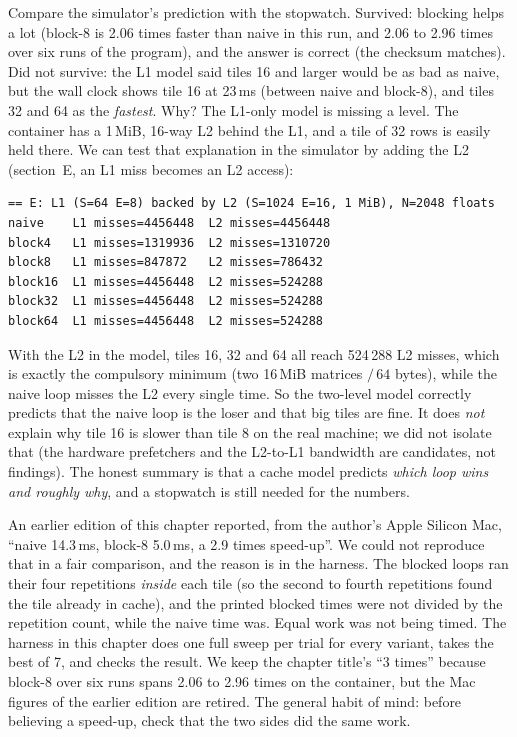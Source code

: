 \begin{example}
Compare the simulator's prediction with the stopwatch. Survived: blocking
helps a lot (block-8 is 2.06 times faster than naive in this run, and
2.06 to 2.96 times over six runs of the program), and the answer is
correct (the checksum matches). Did not survive: the L1 model said tiles
16 and larger would be as bad as naive, but the wall clock shows tile 16
at 23\,ms (between naive and block-8), and tiles 32 and 64 as the \emph{fastest}.
Why? The L1-only model is missing a level. The container has a 1\,MiB,
16-way L2 behind the L1, and a tile of 32 rows is easily held there. We
can test that explanation in the simulator by adding the L2
(section~E, an L1 miss becomes an L2 access):

\begin{lstlisting}[language={},caption={Section E of \texttt{./ch10\_cache\_sim}:
L1 32\,KB 8-way backed by an L2 of 1\,MiB, 16-way ($S=1024$).}]
== E: L1 (S=64 E=8) backed by L2 (S=1024 E=16, 1 MiB), N=2048 floats
naive    L1 misses=4456448  L2 misses=4456448
block4   L1 misses=1319936  L2 misses=1310720
block8   L1 misses=847872   L2 misses=786432
block16  L1 misses=4456448  L2 misses=524288
block32  L1 misses=4456448  L2 misses=524288
block64  L1 misses=4456448  L2 misses=524288
\end{lstlisting}

With the L2 in the model, tiles 16, 32 and 64 all reach 524\,288 L2
misses, which is exactly the compulsory minimum (two 16\,MiB matrices
\(/\,64\) bytes), while the naive loop misses the L2 every single time.
So the two-level model correctly predicts that the naive loop is the
loser and that big tiles are fine. It does \emph{not} explain why tile 16
is slower than tile 8 on the real machine; we did not isolate that (the
hardware prefetchers and the L2-to-L1 bandwidth are candidates, not
findings). The honest summary is that a cache model predicts \emph{which
loop wins and roughly why}, and a stopwatch is still needed for the
numbers.
\end{example}

\begin{example}
An earlier edition of this chapter reported, from the author's Apple
Silicon Mac, ``naive 14.3\,ms, block-8 5.0\,ms, a 2.9 times speed-up''.
We could not reproduce that in a fair comparison, and the reason is in the
harness. The blocked loops ran their four repetitions \emph{inside} each
tile (so the second to fourth repetitions found the tile already in
cache), and the printed blocked times were not divided by the
repetition count, while the naive time was. Equal work was not being
timed. The harness in this chapter does one full sweep per trial for
every variant, takes the best of 7, and checks the result. We keep the
chapter title's ``3 times'' because block-8 over six runs spans 2.06 to
2.96 times on the container, but the Mac figures of the earlier
edition are retired. The general habit of mind: before believing a
speed-up, check that the two sides did the same work.
\end{example}

